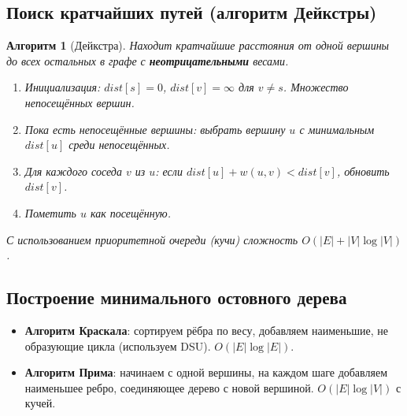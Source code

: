 \documentclass[12pt]{article}
\newtheorem{algorithm}{Алгоритм}
\begin{document}
\begin{enumerate}
\subsection{Поиск кратчайших путей (алгоритм Дейкстры)}
\begin{algorithm}[Дейкстра]
    Находит кратчайшие расстояния от одной вершины до всех остальных в графе с \textbf{неотрицательными} весами.
    \begin{enumerate}
        \item Инициализация: \(dist[s] = 0\), \(dist[v] = \infty\) для \(v \neq s\). Множество непосещённых вершин.
        \item Пока есть непосещённые вершины: выбрать вершину \(u\) с минимальным \(dist[u]\) среди непосещённых.
        \item Для каждого соседа \(v\) из \(u\): если \(dist[u] + w(u,v) < dist[v]\), обновить \(dist[v]\).
        \item Пометить \(u\) как посещённую.
    \end{enumerate}
    С использованием приоритетной очереди (кучи) сложность \(O(|E| + |V|\log|V|)\).
\end{algorithm}

\subsection{Построение минимального остовного дерева}
\begin{itemize}
    \item \textbf{Алгоритм Краскала}: сортируем рёбра по весу, добавляем наименьшие, не образующие цикла (используем DSU). \(O(|E|\log|E|)\).
    \item \textbf{Алгоритм Прима}: начинаем с одной вершины, на каждом шаге добавляем наименьшее ребро, соединяющее дерево с новой вершиной. \(O(|E|\log|V|)\) с кучей.
\end{itemize}


\end{enumerate}
\end{document}

